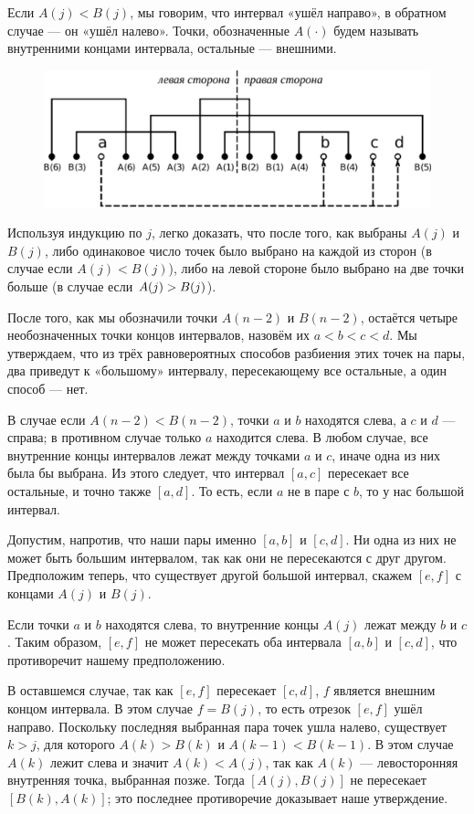 Если $A(j) < B(j)$, мы говорим, что интервал «ушёл направо», в обратном случае --- он «ушёл налево».
Точки, обозначенные $A({\cdot})$ будем называть внутренними концами интервала, остальные --- внешними.

\begin{figure}[h!]
\centering
\includegraphics[scale=0.55]{Figs/Probability/labeling-ru}
\end{figure} 

Используя индукцию по $j$, легко доказать, что после того, как выбраны $A(j)$ и $B(j)$, либо одинаковое число точек было выбрано на каждой из сторон (в случае если $A(j) < B(j)$), либо на левой стороне было выбрано на две точки больше (в случае если $A(j) \z> B(j)$).

После того, как мы обозначили точки $A(n-2)$ и $B(n-2)$, остаётся четыре необозначенных точки концов интервалов, назовём их $a<b<c< d$.
Мы утверждаем, что из трёх равновероятных способов разбиения этих точек на пары, два приведут к «большому» интервалу, пересекающему все остальные, а один способ --- нет.

В случае если $A(n-2) < B(n-2)$, точки $a$ и $b$ находятся слева, а $c$ и $d$ --- справа;
в противном случае только $a$ находится слева.
В любом случае, все внутренние концы интервалов лежат между точками $a$ и $c$, иначе одна из них была бы выбрана.
Из этого следует, что интервал $[a,c]$ пересекает все остальные, и точно также $[a,d]$.
То есть, если $a$ не в паре с $b$, то у нас большой интервал.

Допустим, напротив, что наши пары именно $[a, b]$ и $[c, d]$.
Ни одна из них не может быть большим интервалом, так как они не пересекаются с друг другом.
Предположим теперь, что существует другой большой интервал, скажем $[e,f]$ с концами $A(j)$ и $B(j)$.

Если точки $a$ и $b$ находятся слева, то внутренние концы $A(j)$ лежат между $b$ и $c$.
Таким образом, $[e, f]$ не может пересекать оба интервала $[a, b]$ и $[c, d]$, что противоречит нашему предположению.

В оставшемся случае, так как $[e, f]$ пересекает $[c, d]$, $f$ является внешним концом интервала. 
В этом случае $f=B(j)$, то есть отрезок $[e, f]$ ушёл направо.
Поскольку последняя выбранная пара точек ушла налево, существует $k>j$, для которого $A(k)>B(k)$ и $A(k-1)<B(k-1)$.
В этом случае $A(k)$ лежит слева и значит $A(k) < A(j)$, так как $A(k)$ --- левосторонняя внутренняя точка, выбранная позже.
Тогда $[A(j), B(j)]$ не пересекает $[B(k), A(k)]$; это последнее противоречие доказывает наше утверждение.
\heart

